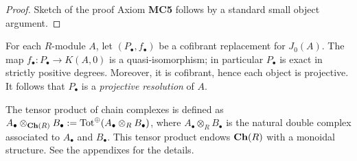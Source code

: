 \begin{refsection}
\begin{proof}{Sketch of the proof}
Axiom {\bfseries MC5} follows by a standard small object argument.
\end{proof}

\begin{eg}
For each $R$-module $A$, let $(P_\bullet,f_\bullet)$ be a cofibrant replacement for $J_0(A)$. The map $f_\bullet \colon P_\bullet \to K(A,0)$ is a quasi-isomorphism; in particular $P_\bullet$ is exact in strictly positive degrees. Moreover, it is cofibrant, hence each object is projective. It follows that $P_\bullet$ is a \emph{projective resolution} of $A$.
\end{eg}

\begin{rmk}
The tensor product of chain complexes is defined as $A_\bullet \otimes_{\mathbf{Ch}(R)} B_\bullet := \operatorname{\mathrm{Tot}}^\oplus(A_\bullet \otimes_R B_\bullet)$, where $A_\bullet \otimes_R B_\bullet$ is the natural double complex associated to $A_\bullet$ and $B_\bullet$. This tensor product endows $\mathbf{Ch}(R)$ with a monoidal structure. See the appendixes for the details.
\end{rmk}


\end{refsection}
